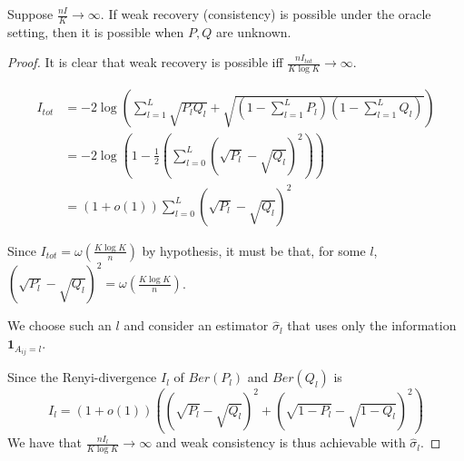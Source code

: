 \documentclass{article}
\begin{document}
\begin{proposition}
Suppose $\frac{nI}{K} \rightarrow \infty$. If weak recovery (consistency) is possible under the oracle setting, then it is possible when $P,Q$ are unknown.
\end{proposition}

\begin{proof}
It is clear that weak recovery is possible iff $\frac{n I_{tot}}{K \log K} \rightarrow \infty$. 

\begin{comment}
Let $C = \{1,...,L\}$, let $P_C = \sum_{l \in C} P_l$ and $Q_C = \sum_{l \in C} Q_l$. We consider an estimator $\hat{\sigma}_C$ that clusters based only on $\mathbf{1}_{A_{ij} \in C}$.

Let $I_C$ be the Renyi-divergence between $Ber(P_C)$ and $Ber(Q_C)$. If $\frac{n I_C}{K \log K} \rightarrow \infty$, then weak recovery is possible with $\hat{\sigma}_C$. So, assume that $\frac{n I_C}{K \log K} \rightarrow c < \infty$. 

\begin{align*}
I_A &\equiv -2 \log \left( \sqrt{P_C Q_C} + \sqrt{(1-P_C)(1-Q_C)} \right) \\
    &= - 2 \log ( 1 - \frac{1}{2} \left( (\sqrt{P_C} - \sqrt{Q_C})^2 + (\sqrt{1-P_C} - \sqrt{1-Q_C})^2 \right) ) \\
  &= (\sqrt{P_C} - \sqrt{Q_C})^2 + (\sqrt{1-P_C} - \sqrt{1-Q_C})^2 + o(1)
\end{align*}

It must be thus that both of these terms are $O( \frac{K \log K}{n})$. Now, we have
\end{comment}

\begin{align*}
I_{tot} &= - 2 \log \left( \sum_{l=1}^L \sqrt{P_l Q_l} + \sqrt{ (1 - \sum_{l=1}^L P_l) ( 1 - \sum_{l=1}^L Q_l) } \right) \\
   & = - 2 \log \left( 1 - \frac{1}{2} \left( \sum_{l=0}^L (\sqrt{P_l} - \sqrt{Q_l})^2 \right) \right) \\
  &= (1+o(1))\sum_{l=0}^L (\sqrt{P_l} - \sqrt{Q_l})^2 
\end{align*}


Since $I_{tot} = \omega( \frac{K \log K}{n} )$ by hypothesis, it must be that, for some $l$, $(\sqrt{P_l} - \sqrt{Q_l})^2 = \omega( \frac{K \log K}{n} )$. 

We choose such an $l$ and consider an estimator $\hat{\sigma}_l$ that uses only the information $\mathbf{1}_{A_{ij} = l}$. 

Since the Renyi-divergence $I_l$ of $Ber(P_l)$ and $Ber(Q_l)$ is
\[
I_l = (1+o(1)) \left( (\sqrt{P_l} - \sqrt{Q_l})^2 + (\sqrt{1-P_l} - \sqrt{1-Q_l})^2 \right)
\]
We have that $\frac{ n I_l}{K \log K} \rightarrow \infty$ and weak consistency is thus achievable with $\hat{\sigma}_l$. 

\end{proof}
\end{document}
